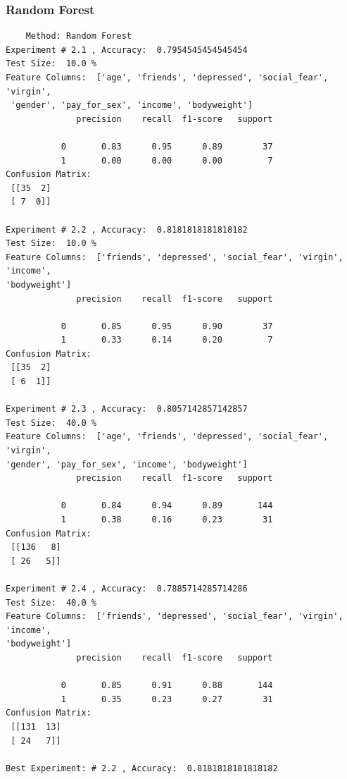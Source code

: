 \documentclass{article}
\begin{document}
\subsubsection{Random Forest}
\begin{commandline}
	\begin{verbatim}
	Method: Random Forest
Experiment # 2.1 , Accuracy:  0.7954545454545454
Test Size:  10.0 %
Feature Columns:  ['age', 'friends', 'depressed', 'social_fear', 'virgin',
 'gender', 'pay_for_sex', 'income', 'bodyweight']
              precision    recall  f1-score   support

           0       0.83      0.95      0.89        37
           1       0.00      0.00      0.00         7
Confusion Matrix:
 [[35  2]
 [ 7  0]]

Experiment # 2.2 , Accuracy:  0.8181818181818182
Test Size:  10.0 %
Feature Columns:  ['friends', 'depressed', 'social_fear', 'virgin', 'income', 
'bodyweight']
              precision    recall  f1-score   support

           0       0.85      0.95      0.90        37
           1       0.33      0.14      0.20         7
Confusion Matrix:
 [[35  2]
 [ 6  1]]

Experiment # 2.3 , Accuracy:  0.8057142857142857
Test Size:  40.0 %
Feature Columns:  ['age', 'friends', 'depressed', 'social_fear', 'virgin', 
'gender', 'pay_for_sex', 'income', 'bodyweight']
              precision    recall  f1-score   support

           0       0.84      0.94      0.89       144
           1       0.38      0.16      0.23        31
Confusion Matrix:
 [[136   8]
 [ 26   5]]

Experiment # 2.4 , Accuracy:  0.7885714285714286
Test Size:  40.0 %
Feature Columns:  ['friends', 'depressed', 'social_fear', 'virgin', 'income', 
'bodyweight']
              precision    recall  f1-score   support

           0       0.85      0.91      0.88       144
           1       0.35      0.23      0.27        31
Confusion Matrix:
 [[131  13]
 [ 24   7]]

Best Experiment: # 2.2 , Accuracy:  0.8181818181818182
	\end{verbatim}
\end{commandline}
\end{document}
